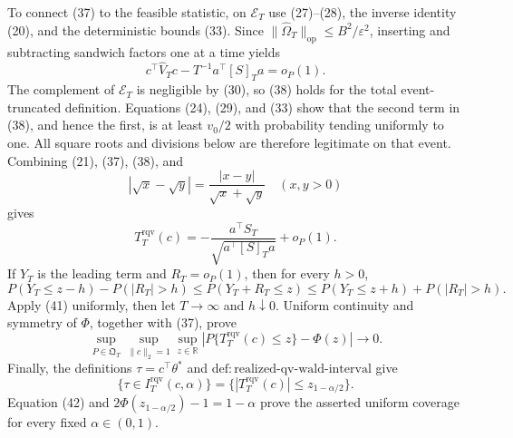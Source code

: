 To connect (37) to the feasible statistic, on \(\mathcal E_T\) use (27)--(28), the inverse identity (20), and the deterministic bounds (33). Since \(\|\widehat\Omega_T\|_{\mathrm{op}}\le B^2/\varepsilon^2\), inserting and subtracting sandwich factors one at a time yields
\[
 c^\top\widehat V_Tc
 -T^{-1}a^\top[S]_Ta=o_P(1).
\tag{38}
\]
The complement of \(\mathcal E_T\) is negligible by (30), so (38) holds for the total event-truncated definition. Equations (24), (29), and (33) show that the second term in (38), and hence the first, is at least \(v_0/2\) with probability tending uniformly to one. All square roots and divisions below are therefore legitimate on that event. Combining (21), (37), (38), and
\[
 |\sqrt x-\sqrt y|=\frac{|x-y|}{\sqrt x+\sqrt y}
 \quad(x,y>0)
\tag{39}
\]
gives
\[
 T_T^{\mathrm{rqv}}(c)
 =-\frac{a^\top S_T}{\sqrt{a^\top[S]_Ta}}+o_P(1).
\tag{40}
\]
If \(Y_T\) is the leading term and \(R_T=o_P(1)\), then for every \(h>0\),
\[
 P(Y_T\le z-h)-P(|R_T|>h)
 \le P(Y_T+R_T\le z)
 \le P(Y_T\le z+h)+P(|R_T|>h).
\tag{41}
\]
Apply (41) uniformly, then let \(T\to\infty\) and \(h\downarrow0\). Uniform continuity and symmetry of \(\Phi\), together with (37), prove
\[
 \sup_{P\in\mathfrak Q_T}\sup_{\|c\|_2=1}\sup_{z\in\mathbb R}
 \left|P\{T_T^{\mathrm{rqv}}(c)\le z\}-\Phi(z)\right|\longrightarrow0.
\tag{42}
\]
Finally, the definitions \(\tau=c^\top\theta^*\) and \(\mathrm{def:realized\text{-}qv\text{-}wald\text{-}interval}\) give
\[
 \{\tau\in I_T^{\mathrm{rqv}}(c,\alpha)\}
 =\{|T_T^{\mathrm{rqv}}(c)|\le z_{1-\alpha/2}\}.
\tag{43}
\]
Equation (42) and \(2\Phi(z_{1-\alpha/2})-1=1-\alpha\) prove the asserted uniform coverage for every fixed \(\alpha\in(0,1)\).

